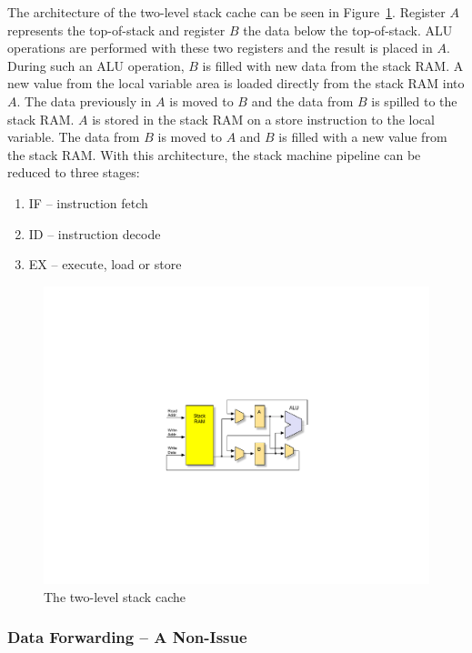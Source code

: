 The architecture of the two-level stack cache can be seen in
Figure~\ref{fig_stack_cache_jop}. Register $A$ represents the
top-of-stack and register $B$ the data below the top-of-stack. ALU
operations are performed with these two registers and the result is
placed in $A$. During such an ALU operation, $B$ is filled with new
data from the stack RAM. A new value from the local variable area is
loaded directly from the stack RAM into $A$. The data previously in
$A$ is moved to $B$ and the data from $B$ is spilled to the stack
RAM. $A$ is stored in the stack RAM on a store instruction to the
local variable. The data from $B$ is moved to $A$ and $B$ is filled
with a new value from the stack RAM.
With this architecture, the stack machine pipeline can be reduced to
three stages:
%
\begin{enumerate}
\item IF -- instruction fetch
\item ID -- instruction decode
\item EX -- execute, load or store
\end{enumerate}


\begin{figure}
    \centering
    \includegraphics[scale=\picscale]{stack/stack_cache_jop}
    \caption{The two-level stack cache}
    \label{fig_stack_cache_jop}
\end{figure}

\subsubsection{Data Forwarding -- A Non-Issue}

